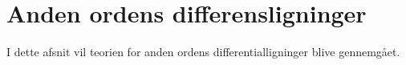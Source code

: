 \section{Anden ordens differensligninger}

I dette afsnit vil teorien for anden ordens differentialligninger blive gennemgået.